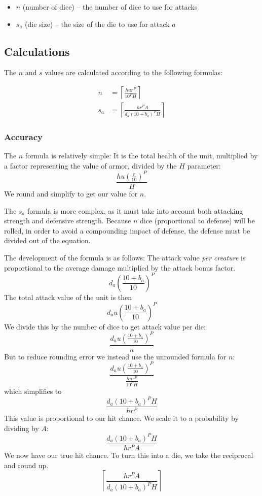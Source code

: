 \documentclass{article}
\begin{document}
\begin{itemize}
    \item $n$ (number of dice) -- the number of dice to use for attacks
    \item $s_a$ (die size) -- the size of the die to use for attack $a$
\end{itemize}

\subsection{Calculations}

The $n$ and $s$ values are calculated according to the following formulas:

\begin{align*}
    n   &=  
        \left\lceil
            \frac
                {h u r^P}
                {10^P H}
        \right\rceil \\
    s_a &=
        \left\lceil
            \frac
                {h r^P A}
                {d_a (10 + b_{a})^P H}
        \right\rceil
\end{align*}

\subsubsection{Accuracy}


The $n$ formula is relatively simple:
It is the total health of the unit,
multiplied by a factor representing the value of armor,
divided by the $H$ parameter:
\[
    \frac
        {h u (\frac{r}{10})^P}
        {H}
\]
We round and simplify to get our value for $n$.

The $s_a$ formula is more complex,
as it must take into account both attacking strength and defensive strength.
Because $n$ dice (proportional to defense) will be rolled,
in order to avoid a compounding impact of defense,
the defense must be divided out of the equation.

The development of the formula is as follows:
The attack value \emph{per creature} is proportional to
the average damage multiplied by the attack bonus factor.
\[
    d_a \left(\frac{10 + b_{a}}{10}\right)^{P}
\]
The total attack value of the unit is then 
\[
    d_a u \left(\frac{10 + b_{a}}{10}\right)^{P}
\]
We divide this by the number of dice to get attack value per die: 
\[
    \frac
        {d_a u \left(\frac{10 + b_{a}}{10}\right)^{P}}
        {n}
\]
But to reduce rounding error we instead use the unrounded formula for $n$: 
\[
    \frac
        {d_a u \left(\frac{10 + b_{a}}{10}\right)^{P}}
        {\frac{h u r^P}{10^P H}}
\]
which simplifies to 
\[
    \frac
        {d_a (10 + b_{a})^P H}
        {h r^P}
\]
This value is proportional to our hit chance.
We scale it to a probability by dividing by $A$:
\[
    \frac
        {d_a (10 + b_{a})^P H}
        {h r^P A}
\]
We now have our true hit chance.
To turn this into a die, we take the reciprocal and round up.
\[
    \left\lceil
        \frac
            {h r^P A}
            {d_a (10 + b_{a})^P H}
    \right\rceil
\]
\end{document}

